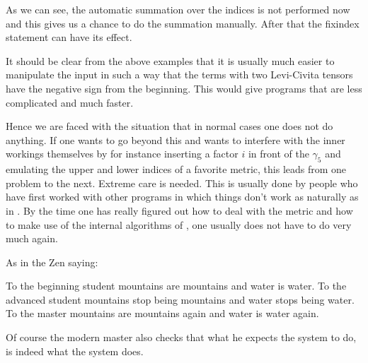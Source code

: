 As we can see, the automatic summation over the indices is not performed 
now and this gives us a chance to do the summation manually. After that the 
fixindex statement can have its effect. \hfill \vspace{2mm}

\noindent It should be clear from the above examples that it is usually 
much easier to manipulate the input in such a way that the terms with two 
Levi-Civita tensors have the negative sign from the beginning. This would 
give programs that are less complicated and much faster. \hfill \vspace{2mm}

\noindent Hence we are faced with the situation that in normal cases one 
does not do anything. If one wants to go beyond this and wants to interfere 
with the inner workings themselves by for instance inserting a factor $i$ 
in front of the $\gamma_5$ and emulating the upper and lower indices of a 
favorite metric, this leads from one problem to the next. Extreme care is 
needed. This is usually done by people who have first worked with other 
programs in which things don't work as naturally as in \FORM\@. By the time 
one has really figured out how to deal with the metric and how to make use 
of the internal algorithms of \FORM, one usually does not have to do very 
much again. \hfill \vspace{2mm}

\noindent As in the Zen saying: \hfill \vspace{2mm}

\noindent To the beginning student mountains are mountains 
and water is water. To the advanced student 
mountains stop being mountains and water stops being water. To the 
master mountains are mountains again and water is water 
again. \hfill \vspace{2mm}

\noindent Of course the modern master also checks that what he expects the 
system to do, is indeed what the system does.
